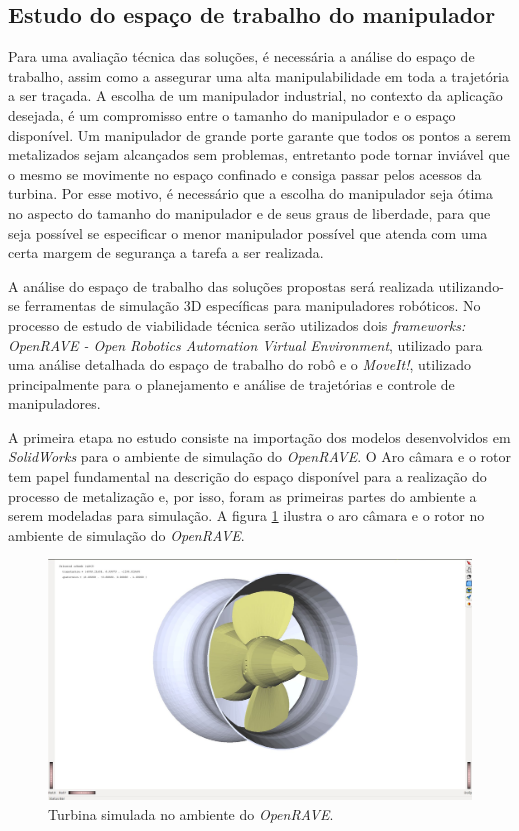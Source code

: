 \subsection{Estudo do espaço de trabalho do manipulador}

Para uma avaliação técnica das soluções, é necessária a análise do espaço de
trabalho, assim como a assegurar uma alta manipulabilidade em toda a trajetória
a ser traçada. A escolha de um manipulador industrial, no contexto da aplicação
desejada, é um compromisso entre o tamanho do manipulador e o espaço disponível.
Um manipulador de grande porte garante que todos os pontos a serem metalizados
sejam alcançados sem problemas, entretanto pode tornar inviável que o mesmo se
movimente no espaço confinado e consiga passar pelos acessos da turbina. Por
esse motivo, é necessário que a escolha do manipulador seja ótima no aspecto do
tamanho do manipulador e de seus graus de liberdade, para que seja possível
se especificar o menor manipulador possível que atenda com uma certa margem de
segurança a tarefa a ser realizada.

A análise do espaço de trabalho das soluções propostas será realizada
utilizando-se ferramentas de simulação 3D específicas para manipuladores robóticos. No
processo de estudo de viabilidade técnica serão utilizados dois
\textit{frameworks:} \textit{OpenRAVE - Open Robotics Automation Virtual
Environment}, utilizado para uma análise detalhada do espaço de trabalho do
robô e o \textit{MoveIt!}, utilizado principalmente para o planejamento e
análise de trajetórias e controle de manipuladores.

A primeira etapa no estudo consiste na importação dos modelos desenvolvidos em
\textit{SolidWorks} para o ambiente de simulação do \textit{OpenRAVE}. O Aro
câmara e o rotor tem papel fundamental na descrição do espaço disponível para a
realização do processo de metalização e, por isso, foram as primeiras partes do
ambiente a serem modeladas para simulação.
A figura \ref{fig::rotor_openrave} ilustra o aro câmara e o rotor no ambiente de 
simulação do \textit{OpenRAVE}. 

\begin{figure}[h!]
\centering
	\includegraphics[width=\columnwidth]{figs/openrave/rotor_openrave}
	\caption{Turbina simulada no ambiente do \textit{OpenRAVE}.}
	\label{fig::rotor_openrave}
\end{figure}

